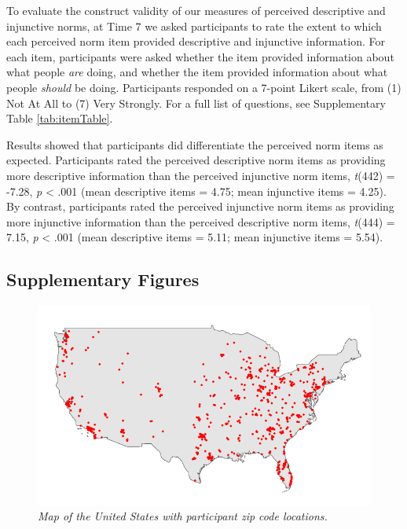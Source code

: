 \documentclass[
  man, donotrepeattitle,floatsintext]{apa6}
\begin{document}
To evaluate the construct validity of our measures of perceived descriptive and injunctive norms, at Time 7 we asked participants to rate the extent to which each perceived norm item provided descriptive and injunctive information. For each item, participants were asked whether the item provided information about what people \emph{are} doing, and whether the item provided information about what people \emph{should} be doing. Participants responded on a 7-point Likert scale, from (1) Not At All to (7) Very Strongly. For a full list of questions, see Supplementary Table \ref{tab:itemTable}.

Results showed that participants did differentiate the perceived norm items as expected. Participants rated the perceived descriptive norm items as providing more descriptive information than the perceived injunctive norm items, \emph{t}(442) = -7.28, \emph{p} \textless{} .001 (mean descriptive items = 4.75; mean injunctive items = 4.25). By contrast, participants rated the perceived injunctive norm items as providing more injunctive information than the perceived descriptive norm items, \emph{t}(444) = 7.15, \emph{p} \textless{} .001 (mean descriptive items = 5.11; mean injunctive items = 5.54).

\newpage

\hypertarget{supplementary-figures}{%
\subsection{Supplementary Figures}\label{supplementary-figures}}



\begin{figure}
\centering
\includegraphics{manuscript_files/figure-latex/plotUSMap-1.pdf}
\caption{\label{fig:plotUSMap}\emph{Map of the United States with participant zip code locations.}}
\end{figure}
\end{document}
